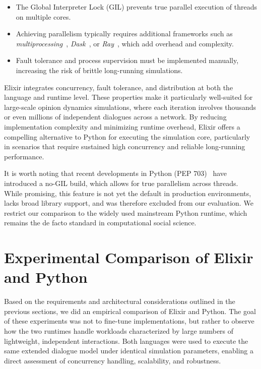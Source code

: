 \documentclass[
]{ceurart}
\begin{document}
\begin{itemize}
	\item The Global Interpreter Lock (GIL) prevents true parallel execution of threads on multiple cores.~\cite{PythonThreading}
	\item Achieving parallelism typically requires additional frameworks such as \emph{multiprocessing}~\cite{PythonMultiprocessing}, \emph{Dask}~\cite{PythonDask}, or \emph{Ray}~\cite{PythonRay}, which add overhead and complexity.
	\item Fault tolerance and process supervision must be implemented manually, increasing the risk of brittle long-running simulations.
\end{itemize}

Elixir integrates concurrency, fault tolerance, and distribution at both the language and runtime level. These properties make it particularly well-suited for large-scale opinion dynamics simulations, where each iteration involves thousands or even millions of independent dialogues across a network. By reducing implementation complexity and minimizing runtime overhead, Elixir offers a compelling alternative to Python for executing the simulation core, particularly in scenarios that require sustained high concurrency and reliable long-running performance.

It is worth noting that recent developments in Python (PEP 703)~\cite{pep703} have introduced a no-GIL build, which allows for true parallelism across threads. While promising, this feature is not yet the default in production environments, lacks broad library support, and was therefore excluded from our evaluation. We restrict our comparison to the widely used mainstream Python runtime, which remains the de facto standard in computational social science.



\section{Experimental Comparison of Elixir and Python}
Based on the requirements and architectural considerations outlined in the previous sections, we did an empirical comparison of Elixir and Python. The goal of these experiments was not to fine-tune implementations, but rather to observe how the two runtimes handle workloads characterized by large numbers of lightweight, independent interactions. Both languages were used to execute the same extended dialogue model under identical simulation parameters, enabling a direct assessment of concurrency handling, scalability, and robustness.
\end{document}
